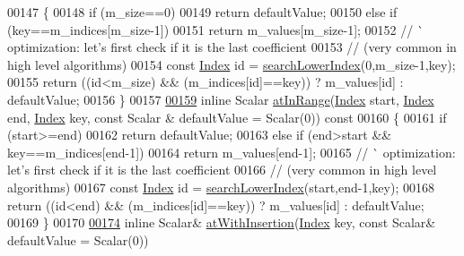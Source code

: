 \begin{DoxyCode}
00147 \textcolor{keyword}{    }\{
00148       \textcolor{keywordflow}{if} (m\_size==0)
00149         \textcolor{keywordflow}{return} defaultValue;
00150       \textcolor{keywordflow}{else} \textcolor{keywordflow}{if} (key==m\_indices[m\_size-1])
00151         \textcolor{keywordflow}{return} m\_values[m\_size-1];
00152       \textcolor{comment}{// ^^  optimization: let's first check if it is the last coefficient}
00153       \textcolor{comment}{// (very common in high level algorithms)}
00154       \textcolor{keyword}{const} \hyperlink{namespace_eigen_a62e77e0933482dafde8fe197d9a2cfde}{Index} \textcolor{keywordtype}{id} = \hyperlink{class_eigen_1_1internal_1_1_compressed_storage_ad96105b5ab19886e96076513eab77da5}{searchLowerIndex}(0,m\_size-1,key);
00155       \textcolor{keywordflow}{return} ((\textcolor{keywordtype}{id}<m\_size) && (m\_indices[\textcolor{keywordtype}{id}]==key)) ? m\_values[id] : defaultValue;
00156     \}
00157 
\hyperlink{class_eigen_1_1internal_1_1_compressed_storage_a70c2745dd270aaa44b415ec2e9bf2ae0}{00159}     \textcolor{keyword}{inline} Scalar \hyperlink{class_eigen_1_1internal_1_1_compressed_storage_a70c2745dd270aaa44b415ec2e9bf2ae0}{atInRange}(\hyperlink{namespace_eigen_a62e77e0933482dafde8fe197d9a2cfde}{Index} start, \hyperlink{namespace_eigen_a62e77e0933482dafde8fe197d9a2cfde}{Index} end, \hyperlink{namespace_eigen_a62e77e0933482dafde8fe197d9a2cfde}{Index} key, \textcolor{keyword}{const} Scalar &
      defaultValue = Scalar(0))\textcolor{keyword}{ const}
00160 \textcolor{keyword}{    }\{
00161       \textcolor{keywordflow}{if} (start>=end)
00162         \textcolor{keywordflow}{return} defaultValue;
00163       \textcolor{keywordflow}{else} \textcolor{keywordflow}{if} (end>start && key==m\_indices[end-1])
00164         \textcolor{keywordflow}{return} m\_values[end-1];
00165       \textcolor{comment}{// ^^  optimization: let's first check if it is the last coefficient}
00166       \textcolor{comment}{// (very common in high level algorithms)}
00167       \textcolor{keyword}{const} \hyperlink{namespace_eigen_a62e77e0933482dafde8fe197d9a2cfde}{Index} \textcolor{keywordtype}{id} = \hyperlink{class_eigen_1_1internal_1_1_compressed_storage_ad96105b5ab19886e96076513eab77da5}{searchLowerIndex}(start,end-1,key);
00168       \textcolor{keywordflow}{return} ((\textcolor{keywordtype}{id}<end) && (m\_indices[\textcolor{keywordtype}{id}]==key)) ? m\_values[id] : defaultValue;
00169     \}
00170 
\hyperlink{class_eigen_1_1internal_1_1_compressed_storage_a8621aa0d1d0e27b025d41b9321968357}{00174}     \textcolor{keyword}{inline} Scalar& \hyperlink{class_eigen_1_1internal_1_1_compressed_storage_a8621aa0d1d0e27b025d41b9321968357}{atWithInsertion}(\hyperlink{namespace_eigen_a62e77e0933482dafde8fe197d9a2cfde}{Index} key, \textcolor{keyword}{const} Scalar& defaultValue = Scalar(0))

\end{DoxyCode}
